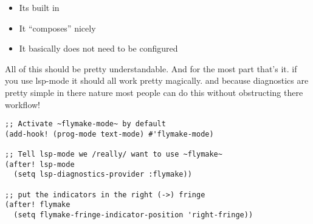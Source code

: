 \documentclass[a4paper]{article}
\begin{document}
\begin{itemize}
\item Its built in
\item It ``composes'' nicely
\item It basically does not need to be configured
\end{itemize}
\begin{notes}
All of this should be pretty understandable. And for the most part that's it. if
you use lsp-mode it should all work pretty magically. and because diagnostics
are pretty simple in there nature most people can do this without obstructing
there workflow!
\end{notes}
\begin{verbatim}
;; Activate ~flymake-mode~ by default
(add-hook! (prog-mode text-mode) #'flymake-mode)

;; Tell lsp-mode we /really/ want to use ~flymake~
(after! lsp-mode
  (setq lsp-diagnostics-provider :flymake))

;; put the indicators in the right (->) fringe
(after! flymake
  (setq flymake-fringe-indicator-position 'right-fringe))
\end{verbatim}
\end{document}
